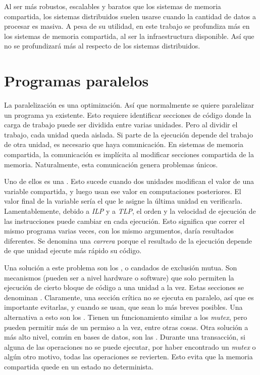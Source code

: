 Al ser más robustos, escalables y baratos que los sistemas de memoria
compartida, los sistemas distribuidos suelen usarse cuando la cantidad de
datos a procesar es masiva. A pesa de su utilidad, en este trabajo se
profundiza más en los sistemas de memoria compartida, al ser la
infraestructura disponible. Así que no se profundizará más al respecto de los
sistemas distribuidos.

\section{Programas paralelos}

La paralelización es una optimización. Así que normalmente se quiere
paralelizar un programa ya existente. Esto requiere identificar secciones de
código donde la carga de trabajo puede ser dividida entre varias unidades.
Pero al dividir el trabajo, cada unidad queda aislada. Si parte de la ejecución
depende del trabajo de otra unidad, es necesario que haya comunicación. En
sistemas de memoria compartida, la comunicación es implícita al modificar
secciones compartida de la memoria. Naturalmente, esta comunicación genera
problemas únicos.

Uno de ellos es una . Esto sucede cuando dos
unidades modifican el valor de una variable compartida, y luego usan ese
valor en computaciones posteriores. El valor final de la variable sería el que
le asigne la última unidad en verificarla. Lamentablemente, debido a \emph{ILP}
y a \emph{TLP}, el orden y la velocidad de ejecución de las instrucciones
puede cambiar en cada ejecución. Esto significa que correr el mismo programa
varias veces, con los mismo argumentos, daría resultados diferentes.
Se denomina una \emph{carrera} porque el resultado de la ejecución depende de
que unidad ejecute más rápido su código.

Una solución a este problema son los , o candados de exclusión
mutua. Son mecanismos (pueden ser a nivel hardware o software) que solo
permiten la ejecución de cierto bloque de código a una unidad a la vez. Estas
secciones se denominan . Claramente, una sección
crítica no se ejecuta en paralelo, así que es importante evitarlas, y cuando
se usan, que sean lo más breves posibles. Una alternativa a esto son los
. Tienen un funcionamiento similar a los \emph{mutex}, pero
pueden permitir más de un permiso a la vez, entre otras cosas. Otra solución
a más alto nivel, común en bases de datos, son las . Durante
una transacción, si alguna de las operaciones no se puede ejecutar, por haber
encontrado un \emph{mutex} o algún otro motivo, todas las operaciones se
revierten. Esto evita que la memoria compartida quede en un estado no
determinista.

